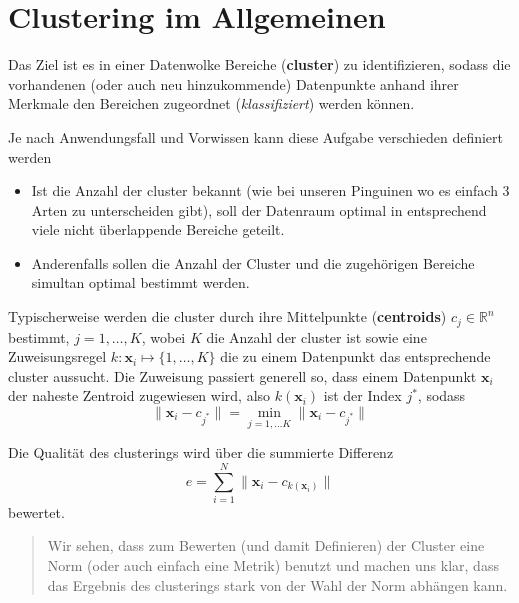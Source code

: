 \documentclass[]{book}
\providecommand{\tightlist}{%
  \setlength{\itemsep}{0pt}\setlength{\parskip}{0pt}}
\newenvironment {JHSAYS} [0] {\begin{quote}\color{jhsc}} {\end{quote}}
\theoremstyle{definition}
\theoremstyle{definition}
\theoremstyle{definition}
\theoremstyle{definition}
\theoremstyle{remark}
\begin{document}
\hypertarget{clustering-im-allgemeinen}{%
\section{Clustering im Allgemeinen}\label{clustering-im-allgemeinen}}

Das Ziel ist es in einer Datenwolke Bereiche (\textbf{cluster}) zu identifizieren, sodass die vorhandenen (oder auch neu hinzukommende) Datenpunkte anhand ihrer Merkmale den Bereichen zugeordnet (\emph{klassifiziert}) werden können.

Je nach Anwendungsfall und Vorwissen kann diese Aufgabe verschieden definiert werden

\begin{itemize}
\tightlist
\item
  Ist die Anzahl der cluster bekannt (wie bei unseren Pinguinen wo es einfach 3 Arten zu unterscheiden gibt), soll der Datenraum optimal in entsprechend viele nicht überlappende Bereiche geteilt.
\item
  Anderenfalls sollen die Anzahl der Cluster und die zugehörigen Bereiche simultan optimal bestimmt werden.
\end{itemize}

Typischerweise werden die cluster durch ihre Mittelpunkte (\textbf{centroids}) \(c_j\in \mathbb R^{n}\) bestimmt, \(j=1,\dots,K\), wobei \(K\) die Anzahl der cluster ist sowie eine Zuweisungsregel \(k\colon {\mathbf{x} _ i}\mapsto \{1,\dots,K\}\) die zu einem Datenpunkt das entsprechende cluster aussucht. Die Zuweisung passiert generell so, dass einem Datenpunkt \({\mathbf{x} _ i}\) der naheste Zentroid zugewiesen wird, also \(k({\mathbf{x} _ i})\) ist der Index \(j^*\), sodass
\begin{equation*}
\|{\mathbf{x} _ i}- c_{j^*}\| = \min_{j=1,\dots K} \|{\mathbf{x} _ i}- c_{j^*}\|
\end{equation*}

Die Qualität des clusterings wird über die summierte Differenz
\begin{equation*}
e = \sum_{i=1}^N\|{\mathbf{x} _ i}- c_{k({\mathbf{x} _ i})}\|
\end{equation*}
bewertet.

\leavevmode\hypertarget{cluster-norms}{}%
\begin{JHSAYS}
Wir sehen, dass zum Bewerten (und damit Definieren) der Cluster eine Norm (oder auch einfach eine Metrik) benutzt und machen uns klar, dass das Ergebnis des clusterings stark von der Wahl der Norm abhängen kann.

\end{JHSAYS}
\end{document}

